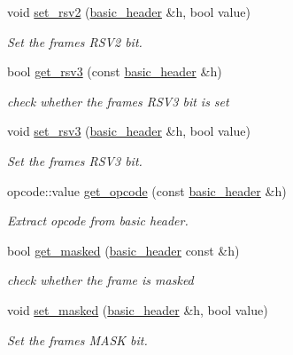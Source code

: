 \begin{DoxyCompactItemize}
void \hyperlink{namespacewebsocketpp_1_1frame_a0c97068961b3b3d2e1b83a9bd273c5cf}{set\+\_\+rsv2} (\hyperlink{structwebsocketpp_1_1frame_1_1basic__header}{basic\+\_\+header} \&h, bool value)
\begin{DoxyCompactList}\small\item\em Set the frame\textquotesingle{}s R\+S\+V2 bit. \end{DoxyCompactList}\item 
bool \hyperlink{namespacewebsocketpp_1_1frame_a4dc0cc35b38986b9b56120ef297dd795}{get\+\_\+rsv3} (const \hyperlink{structwebsocketpp_1_1frame_1_1basic__header}{basic\+\_\+header} \&h)
\begin{DoxyCompactList}\small\item\em check whether the frame\textquotesingle{}s R\+S\+V3 bit is set \end{DoxyCompactList}\item 
void \hyperlink{namespacewebsocketpp_1_1frame_a293e2ed0dd6efa704f27c29a1e595715}{set\+\_\+rsv3} (\hyperlink{structwebsocketpp_1_1frame_1_1basic__header}{basic\+\_\+header} \&h, bool value)
\begin{DoxyCompactList}\small\item\em Set the frame\textquotesingle{}s R\+S\+V3 bit. \end{DoxyCompactList}\item 
opcode\+::value \hyperlink{namespacewebsocketpp_1_1frame_a235192baaf86f38158dc33f178c04661}{get\+\_\+opcode} (const \hyperlink{structwebsocketpp_1_1frame_1_1basic__header}{basic\+\_\+header} \&h)
\begin{DoxyCompactList}\small\item\em Extract opcode from basic header. \end{DoxyCompactList}\item 
bool \hyperlink{namespacewebsocketpp_1_1frame_a4e8cf8ae88a7a8fdb2b3ea86623d01d2}{get\+\_\+masked} (\hyperlink{structwebsocketpp_1_1frame_1_1basic__header}{basic\+\_\+header} const \&h)
\begin{DoxyCompactList}\small\item\em check whether the frame is masked \end{DoxyCompactList}\item 
void \hyperlink{namespacewebsocketpp_1_1frame_a9adfd26ffa9dccf738e6b62b5dccf7f0}{set\+\_\+masked} (\hyperlink{structwebsocketpp_1_1frame_1_1basic__header}{basic\+\_\+header} \&h, bool value)
\begin{DoxyCompactList}\small\item\em Set the frame\textquotesingle{}s M\+A\+SK bit. \end{DoxyCompactList}\item 

\end{DoxyCompactItemize}
